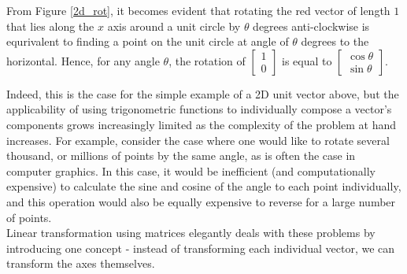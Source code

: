 \documentclass[12pt, a4paper]{article}
\begin{document}
From Figure \ref{2d_rot}, it becomes evident that rotating the red vector of
length $1$ that lies along the $x$ axis around a unit circle by $\theta$ degrees
anti-clockwise is equrivalent to finding a point on the unit circle at angle of
$\theta$ degrees to the horizontal. Hence, for any angle $\theta$, the rotation
of $\begin{bmatrix}1 \\ 0\end{bmatrix}$ is equal to $\begin{bmatrix}\cos\theta
\\
        \sin\theta\end{bmatrix}$. \vspace{0.2cm}

Indeed, this is the case for the simple example of a 2D unit vector above, but
the applicability of using trigonometric functions to individually compose a
vector's components grows increasingly limited as the complexity of the problem
at hand increases. For example, consider the case where one would like to rotate
several thousand, or millions of points by the same angle, as is often the case
in computer graphics. In this case, it would be inefficient (and computationally
expensive) to calculate the sine and cosine of the angle to each point
individually, and this operation would also be equally expensive to reverse for
a large number of points. \\

Linear transformation using matrices elegantly deals with these problems by
introducing one concept - instead of transforming each individual vector, we can
transform the axes themselves. \\
\end{document}
